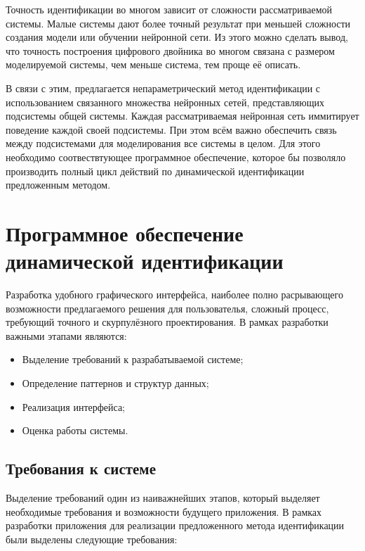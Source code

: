 Точность идентификации во многом зависит от сложности рассматриваемой системы.
Малые системы дают более точный результат при меньшей сложности создания модели
или обучении нейронной сети. Из этого можно сделать вывод, что точность
построения цифрового двойника во многом связана с размером моделируемой
системы, чем меньше система, тем проще её описать. 

В связи с этим, предлагается непараметрический метод идентификации с
использованием связанного множества нейронных сетей, представляющих подсистемы
общей системы. Каждая рассматриваемая нейронная сеть иммитирует поведение
каждой своей подсистемы. При этом всём важно обеспечить связь между
подсистемами для моделирования все системы в целом. Для этого необходимо
соотвествтующее программное обеспечение, которое бы позволяло производить
полный цикл действий по динамической идентификации предложенным методом. 

\section{Программное обеспечение динамической идентификации}

Разработка удобного графического интерфейса, наиболее полно расрывающего
возможности предлагаемого решения для пользователья, сложный процесс, требующий
точного и скурпулёзного проектирования. В рамках разработки важными этапами
являются:

\begin{itemize}
  \item Выделение требований к разрабатываемой системе;
  \item Определение паттернов и структур данных;
  \item Реализация интерфейса;
  \item Оценка работы системы.
\end{itemize}

\subsection{Требования к системе}

Выделение требований один из наиважнейших этапов, который выделяет необходимые требования и возможности будущего приложения. В рамках разработки приложения для реализации предложенного метода идентификации были выделены следующие требования:

